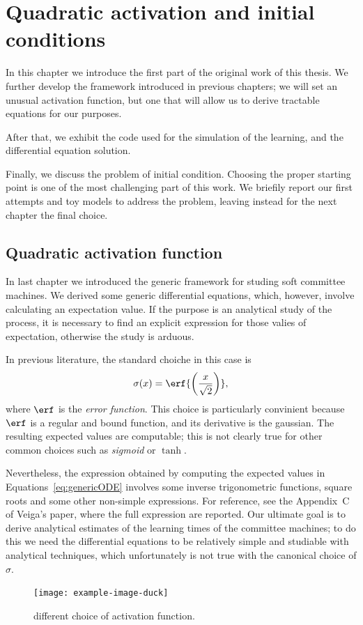 \chapter{Quadratic activation and initial conditions}
In this chapter we introduce the first part of the original work of this thesis.
We further develop the framework introduced in previous chapters;
we will set an unusual activation function, but one that will allow us to derive
tractable equations for our purposes.

After that, we exhibit the code used for the simulation of the learning, and the differential
equation solution. 

Finally, we discuss the problem of initial condition. Choosing the proper starting
point is one of the most challenging part of this work. We briefily report our first
attempts and toy models to address the problem, leaving instead for the next chapter
the final choice.

\section{Quadratic activation function}
In last chapter we introduced the generic framework for studing soft committee machines.
We derived some generic differential equations, which, however, involve calculating an expectation value.
If the purpose is an analytical study of the process, it is necessary to find an explicit expression
for those valies of expectation, otherwise the study is arduous.

In previous literature\cite{saad1995line,goldt2019dynamics,veiga2022phase}, the standard choiche in this case is
\[\sigma{(x)} = \erf{\left(\frac{x}{\sqrt{2}}\right)},\]
where \(\erf\) is the \emph{error function}. This choice is particularly convinient
because \(\erf\) is a regular and bound function, and its derivative is the gaussian.
The resulting expected values are computable; this is not clearly true for other 
common choices such as \emph{sigmoid} or \(\tanh\).

Nevertheless, the expression obtained by computing the expected values in Equations~\eqref{eq:genericODE} involves
some inverse trigonometric functions, square roots and some other non-simple expressions. For reference, see
the Appendix~C of Veiga's paper\cite{veiga2022phase}, where the full expression are reported.
Our ultimate goal is to derive analytical estimates of the learning times of the committee machines;
to do this we need the differential equations to be relatively simple and studiable with analytical techniques,
which unfortunately is not true with the canonical choice of \(\sigma\).
\begin{figure}
  \centering
  \texttt{[image: example-image-duck]}
  \caption{ different choice of activation function.}
\end{figure}

